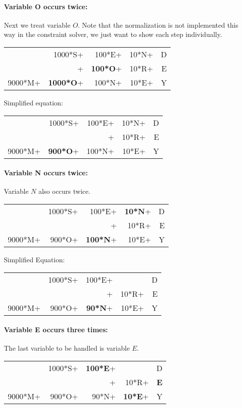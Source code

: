 \documentclass[a4paper]{article}
\begin{document}
\paragraph{Variable O occurs twice:} Next we treat variable $O$. Note that the normalization is not implemented this way in the constraint solver, we just want to show each step individually.

\begin{tabular}{rrrrr}
& 1000*S+ & 100*E+ & 10*N+ & D \\
& + & {\bf 100*O}+ & 10*R+ & E \\ \hline
9000*M+ & {\bf 1000*O}+ & 100*N+ & 10*E+ & Y
\end{tabular}

Simplified equation:

\begin{tabular}{rrrrr}
& 1000*S+ & 100*E+ & 10*N+ & D \\
&  & + & 10*R+ & E \\ \hline
9000*M+ & {\bf 900*O}+ & 100*N+ & 10*E+ & Y
\end{tabular}

\paragraph{Variable N occurs twice:} Variable $N$ also occurs twice.

\begin{tabular}{rrrrr}
& 1000*S+ & 100*E+ & {\bf 10*N}+ & D \\
&  & + & 10*R+ & E \\ \hline
9000*M+ & 900*O+ & {\bf 100*N}+ & 10*E+ & Y
\end{tabular}

Simplified Equation: 

\begin{tabular}{rrrrr}
& 1000*S+ & 100*E+ &  & D \\
&  & + & 10*R+ & E \\ \hline
9000*M+ & 900*O+ & {\bf 90*N}+ & 10*E+ & Y
\end{tabular}

\paragraph{Variable E occurs three times:} The last variable to be handled is variable $E$.

\begin{tabular}{rrrrr}
& 1000*S+ & {\bf 100*E}+ &  & D \\
&  & + & 10*R+ & {\bf E} \\ \hline
9000*M+ & 900*O+ & 90*N+ & {\bf 10*E}+ & Y
\end{tabular}
\end{document}
